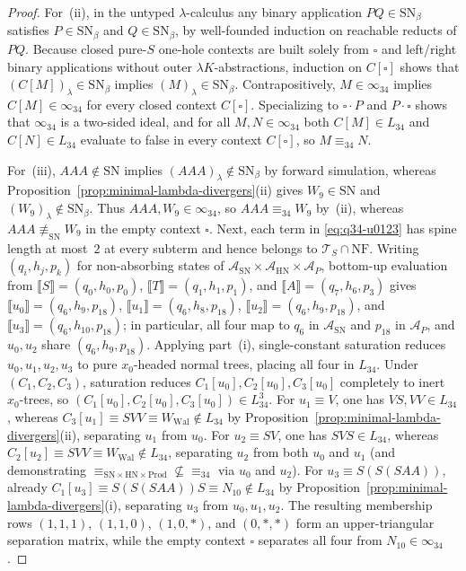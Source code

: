 \documentclass[11pt,reqno]{amsart}
\numberwithin{equation}{section}
\theoremstyle{plain}
\theoremstyle{definition}
\theoremstyle{remark}
\newcommand{\TS}{\mathcal{T}_S}
\newcommand{\NF}{\mathrm{NF}}
\newcommand{\SN}{\mathrm{SN}}
\newcommand{\HN}{\mathrm{HN}}
\newcommand{\Prod}{\mathrm{Prod}}
\newcommand{\sem}[1]{\llbracket #1 \rrbracket}
\begin{document}
\begin{proof}
For~(ii), in the untyped $\lambda$-calculus any binary application $P Q \in \SN_\beta$ satisfies $P \in \SN_\beta$ and $Q \in \SN_\beta$, by well-founded induction on reachable reducts of $P Q$. Because closed pure-$S$ one-hole contexts are built solely from $\square$ and left/right binary applications without outer $\lambda K$-abstractions, induction on $C[\square]$ shows that $(C[M])_\lambda \in \SN_\beta$ implies $(M)_\lambda \in \SN_\beta$. Contrapositively, $M \in \infty_{34}$ implies $C[M] \in \infty_{34}$ for every closed context $C[\square]$. Specializing to $\square \cdot P$ and $P \cdot \square$ shows that $\infty_{34}$ is a two-sided ideal, and for all $M, N \in \infty_{34}$ both $C[M] \in L_{34}$ and $C[N] \in L_{34}$ evaluate to false in every context $C[\square]$, so $M \equiv_{34} N$.

For~(iii), $A A A \notin \SN$ implies $(A A A)_\lambda \notin \SN_\beta$ by forward simulation, whereas Proposition~\ref{prop:minimal-lambda-divergers}(ii) gives $W_9 \in \SN$ and $(W_9)_\lambda \notin \SN_\beta$. Thus $A A A, W_9 \in \infty_{34}$, so $A A A \equiv_{34} W_9$ by~(ii), whereas $A A A \not\equiv_{\SN} W_9$ in the empty context $\square$. Next, each term in \eqref{eq:q34-u0123} has spine length at most~$2$ at every subterm and hence belongs to $\TS \cap \NF$. Writing $(q_i, h_j, p_k)$ for non-absorbing states of $\mathcal{A}_{\SN} \times \mathcal{A}_{\HN} \times \mathcal{A}_P$, bottom-up evaluation from $\sem{S} = (q_0, h_0, p_0)$, $\sem{T} = (q_1, h_1, p_1)$, and $\sem{A} = (q_7, h_6, p_3)$ gives $\sem{u_0} = (q_6, h_9, p_{18})$, $\sem{u_1} = (q_6, h_8, p_{18})$, $\sem{u_2} = (q_6, h_9, p_{18})$, and $\sem{u_3} = (q_6, h_{10}, p_{18})$; in particular, all four map to $q_6$ in $\mathcal{A}_{\SN}$ and $p_{18}$ in $\mathcal{A}_P$, and $u_0, u_2$ share $(q_6, h_9, p_{18})$. Applying part~(i), single-constant saturation reduces $u_0, u_1, u_2, u_3$ to pure $x_0$-headed normal trees, placing all four in $L_{34}$. Under $(C_1, C_2, C_3)$, saturation reduces $C_1[u_0], C_2[u_0], C_3[u_0]$ completely to inert $x_0$-trees, so $(C_1[u_0], C_2[u_0], C_3[u_0]) \in L_{34}^3$. For $u_1 \equiv V$, one has $V S, V V \in L_{34}$, whereas $C_3[u_1] \equiv S V V \equiv W_{\mathrm{Wal}} \notin L_{34}$ by Proposition~\ref{prop:minimal-lambda-divergers}(ii), separating $u_1$ from $u_0$. For $u_2 \equiv S V$, one has $S V S \in L_{34}$, whereas $C_2[u_2] \equiv S V V \equiv W_{\mathrm{Wal}} \notin L_{34}$, separating $u_2$ from both $u_0$ and $u_1$ (and demonstrating ${\equiv_{\SN \times \HN \times \Prod}} \not\subseteq {\equiv_{34}}$ via $u_0$ and $u_2$). For $u_3 \equiv S(S(S A A))$, already $C_1[u_3] \equiv S(S(S A A))S \equiv N_{10} \notin L_{34}$ by Proposition~\ref{prop:minimal-lambda-divergers}(i), separating $u_3$ from $u_0, u_1, u_2$. The resulting membership rows $(1, 1, 1)$, $(1, 1, 0)$, $(1, 0, *)$, and $(0, *, *)$ form an upper-triangular separation matrix, while the empty context $\square$ separates all four from $N_{10} \in \infty_{34}$.
\end{proof}
\end{document}
